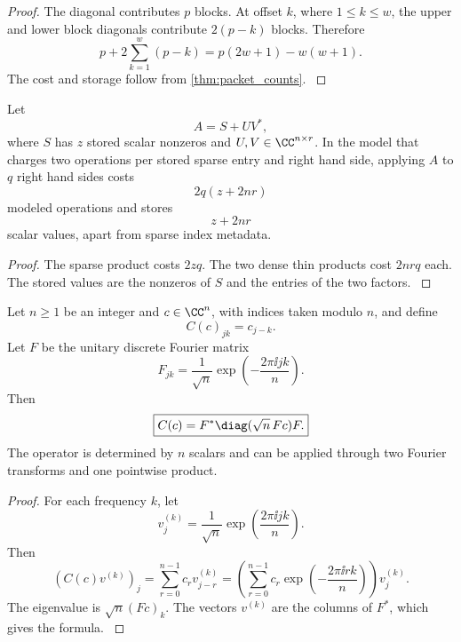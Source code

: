 \begin{proof}\label{main:proof:012}
The diagonal contributes \(p\) blocks. At offset \(k\), where \(1\leq k\leq w\), the upper and lower block diagonals contribute \(2(p-k)\) blocks. Therefore
\[
p+2\sum_{k=1}^{w}(p-k)
=
p(2w+1)-w(w+1).
\]
The cost and storage follow from \cref{thm:packet_counts}.
\label{main:proof:012:end}\end{proof}

\begin{proposition}\label{main:proposition:005}\label{prop:sparse_low_rank}
Let
\[
A=S+UV^*,
\]
where \(S\) has \(z\) stored scalar nonzeros and \(U,V\in\CC^{n\times r}\). In the model that charges two operations per stored sparse entry and right hand side, applying \(A\) to \(q\) right hand sides costs
\[
\boxed{
2q(z+2nr)
}
\]
modeled operations and stores
\[
\boxed{
z+2nr
}
\]
scalar values, apart from sparse index metadata.
\end{proposition}

\begin{proof}\label{main:proof:013}
The sparse product costs \(2zq\). The two dense thin products cost \(2nrq\) each. The stored values are the nonzeros of \(S\) and the entries of the two factors.
\label{main:proof:013:end}\end{proof}

\begin{theorem}\label{main:theorem:006}\label{thm:circulant}
Let $n\ge1$ be an integer and $c\in\CC^n$, with indices taken modulo $n$, and define
\[
C(c)_{jk}=c_{j-k}.
\]
Let \(F\) be the unitary discrete Fourier matrix
\[
F_{jk}
=
\frac{1}{\sqrt n}
\exp\left(-\frac{2\pi\ii jk}{n}\right).
\]
Then
\[
\boxed{
C(c)
=
F^*\diag(\sqrt n\,Fc)F.
}
\]
The operator is determined by \(n\) scalars and can be applied through two Fourier transforms and one pointwise product.
\end{theorem}

\begin{proof}\label{main:proof:014}
For each frequency \(k\), let
\[
v^{(k)}_j
=
\frac{1}{\sqrt n}
\exp\left(\frac{2\pi\ii jk}{n}\right).
\]
Then
\[
(C(c)v^{(k)})_j
=
\sum_{r=0}^{n-1}c_rv^{(k)}_{j-r}
=
\left(
\sum_{r=0}^{n-1}
c_r\exp\left(-\frac{2\pi\ii rk}{n}\right)
\right)v^{(k)}_j.
\]
The eigenvalue is \(\sqrt n(Fc)_k\). The vectors \(v^{(k)}\) are the columns of \(F^*\), which gives the formula.
\label{main:proof:014:end}\end{proof}

